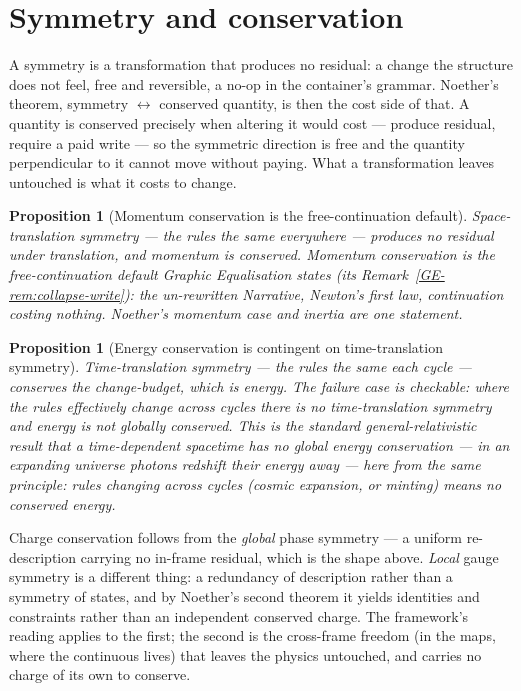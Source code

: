 \documentclass[11pt,a4paper]{article}
\newtheorem{proposition}[definition]{Proposition}
\theoremstyle{remark}\newtheorem{remark}[definition]{Remark}
\begin{document}
\section{Symmetry and conservation}\label{sec:noether}
A symmetry is a transformation that produces no residual: a change the structure
does not feel, free and reversible, a no-op in the container's grammar. Noether's
theorem, symmetry $\leftrightarrow$ conserved quantity, is then the cost side of
that. A quantity is conserved precisely when altering it would cost --- produce
residual, require a paid write --- so the symmetric direction is free and the
quantity perpendicular to it cannot move without paying. What a transformation
leaves untouched is what it costs to change.

\begin{proposition}[Momentum conservation is the free-continuation default]\label{prop:momentum-cons}
Space-translation symmetry --- the rules the same everywhere --- produces no
residual under translation, and momentum is conserved. Momentum conservation is
the free-continuation default Graphic Equalisation states (its
Remark~\ref{GE-rem:collapse-write}): the un-rewritten Narrative, Newton's first
law, continuation costing nothing. Noether's momentum case and inertia are one
statement.
\end{proposition}

\begin{proposition}[Energy conservation is contingent on time-translation symmetry]\label{prop:energy-cons}
Time-translation symmetry --- the rules the same each cycle --- conserves the
change-budget, which is energy. The failure case is checkable: where the rules
effectively change across cycles there is no time-translation symmetry and energy
is not globally conserved. This is the standard general-relativistic result that
a time-dependent spacetime has no global energy conservation --- in an expanding
universe photons redshift their energy away --- here from the same principle:
rules changing across cycles (cosmic expansion, or minting) means no conserved
energy.
\end{proposition}
Charge conservation follows from the \emph{global} phase symmetry --- a
uniform re-description carrying no in-frame residual, which is the shape above.
\emph{Local} gauge symmetry is a different thing: a redundancy of description
rather than a symmetry of states, and by Noether's second theorem it yields
identities and constraints rather than an independent conserved charge. The
framework's reading applies to the first; the second is the cross-frame freedom
(in the maps, where the continuous lives) that leaves the physics untouched, and
carries no charge of its own to conserve.
\end{document}
